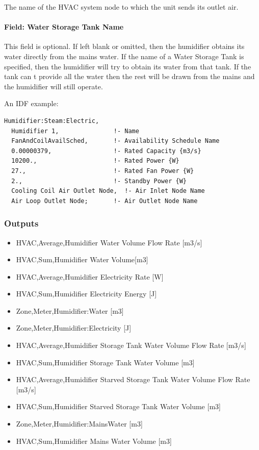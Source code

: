 The name of the HVAC system node to which the unit sends its outlet air.

\paragraph{Field: Water Storage Tank Name}\label{field-water-storage-tank-name}

This field is optional. If left blank or omitted, then the humidifier obtains its water directly from the mains water. If the name of a Water Storage Tank is specified, then the humidifier will try to obtain its water from that tank. If the tank can t provide all the water then the rest will be drawn from the mains and the humidifier will still operate.

An IDF example:

\begin{lstlisting}
Humidifier:Steam:Electric,
  Humidifier 1,               !- Name
  FanAndCoilAvailSched,       !- Availability Schedule Name
  0.00000379,                 !- Rated Capacity {m3/s}
  10200.,                     !- Rated Power {W}
  27.,                        !- Rated Fan Power {W}
  2.,                         !- Standby Power {W}
  Cooling Coil Air Outlet Node,  !- Air Inlet Node Name
  Air Loop Outlet Node;       !- Air Outlet Node Name
\end{lstlisting}

\subsubsection{Outputs}\label{outputs-016}

\begin{itemize}
\item
  HVAC,Average,Humidifier Water Volume Flow Rate {[}m3/s{]}
\item
  HVAC,Sum,Humidifier Water Volume{[}m3{]}
\item
  HVAC,Average,Humidifier Electricity Rate {[}W{]}
\item
  HVAC,Sum,Humidifier Electricity Energy {[}J{]}
\item
  Zone,Meter,Humidifier:Water {[}m3{]}
\item
  Zone,Meter,Humidifier:Electricity {[}J{]}
\item
  HVAC,Average,Humidifier Storage Tank Water Volume Flow Rate {[}m3/s{]}
\item
  HVAC,Sum,Humidifier Storage Tank Water Volume {[}m3{]}
\item
  HVAC,Average,Humidifier Starved Storage Tank Water Volume Flow Rate {[}m3/s{]}
\item
  HVAC,Sum,Humidifier Starved Storage Tank Water Volume {[}m3{]}
\item
  Zone,Meter,Humidifier:MainsWater {[}m3{]}
\item
  HVAC,Sum,Humidifier Mains Water Volume {[}m3{]}
\end{itemize}

